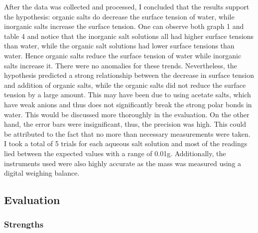 \documentclass{article}
\begin{document}
\par{After the data was collected and processed, I concluded that the results support the hypothesis: organic salts do decrease the surface tension of water, while inorganic salts increase the surface tension. One can observe both graph 1 and table 4 and notice that the inorganic salt solutions all had higher surface tensions than water, while the organic salt solutions had lower surface tensions than water. Hence organic salts reduce the surface tension of water while inorganic salts increase it. There were no anomalies for these trends. Nevertheless, the hypothesis predicted a strong relationship between the decrease in surface tension and addition of organic salts, while the organic salts did not reduce the surface tension by a large amount. This may have been due to using acetate salts, which have weak anions and thus does not significantly  break the strong polar bonds in water. This would be discussed more thoroughly in the evaluation. On the other hand, the error bars were insignificant, thus, the precision was  high. This could be attributed to the fact that no more than necessary measurements were taken. I took a total of 5 trials for each aqueous salt solution and most of the readings lied between the expected values with a range of 0.01g. Additionally, the instruments used were also highly accurate as the mass was measured using a digital weighing balance.}

\subsection{Evaluation}

\subsubsection{Strengths}
\end{document}

